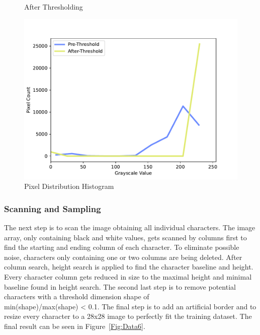 \documentclass[@CLASSOPTIONS@]{tumarticle}
\begin{document}
\begin{figure}[!htb]
   \begin{minipage}{0.48\textwidth}
     \centering
     \caption{After Thresholding}\label{Fig:Data4}
   \end{minipage}
  \hfill
   \begin{minipage}{0.48\textwidth}
     \centering
     \includegraphics[width=.9\linewidth]{figures/histogram}
     \caption{Pixel Distribution Histogram}\label{Fig:Data5}
   \end{minipage}
\end{figure}

\subsubsection{Scanning and Sampling}

The next step is to scan the image obtaining all individual characters.
The image array, only containing black and white values, gets scanned by columns first to find the starting
and ending column of each character.
To eliminate possible noise, characters only containing one or two columns are being deleted.
After column search, height search is applied to find the character baseline and height.
Every character column gets reduced in size to the maximal height and minimal baseline found in height search.
The second last step is to remove potential characters with a threshold dimension shape of\\
min(shape)/max(shape) < 0.1.
The final step is to add an artificial border and to resize every character to a 28x28 image to
perfectly fit the training dataset.
The final result can be seen in Figure~\ref{Fig:Data6}.
\end{document}
